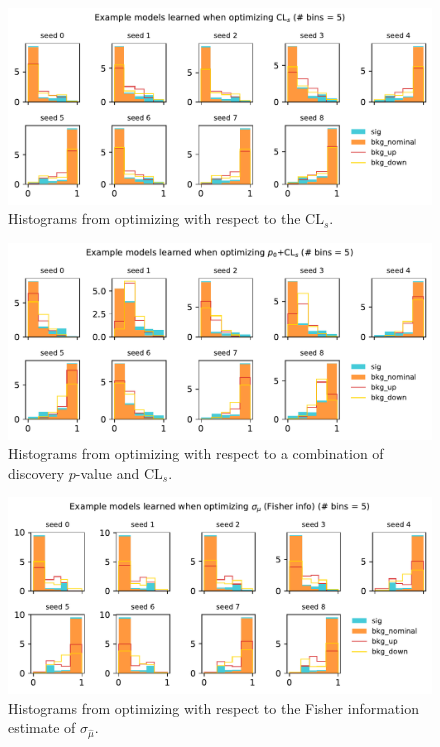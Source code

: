 \documentclass[
  11pt,
  numbers=noendperiod]{book}
\begin{document}
\begin{figure}

{\centering \includegraphics{./images/new-hist-models-CLs-5bin.pdf}

}

\caption{Histograms from optimizing with respect to the
\(\mathrm{CL}_s\).}

\end{figure}

\begin{figure}

{\centering \includegraphics{./images/new-hist-models-COMB-5bin.pdf}

}

\caption{Histograms from optimizing with respect to a combination of
discovery \(p\)-value and \(\mathrm{CL}_s\).}

\end{figure}


\begin{figure}

{\centering \includegraphics{./images/new-hist-models-poi_uncert-5bin.pdf}

}

\caption{Histograms from optimizing with respect to the Fisher
information estimate of \(\sigma_{\hat{\mu}}\).}

\end{figure}
\end{document}
